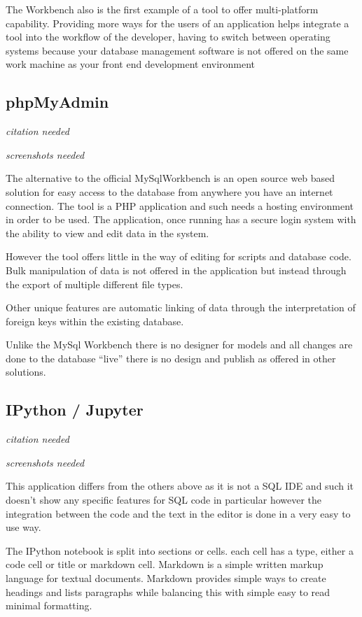 The Workbench also is the first example of a tool to offer
multi-platform capability. Providing more ways for the users of an
application helps integrate a tool into the workflow of the developer,
having to switch between operating systems because your database
management software is not offered on the same work machine as your
front end development environment

\subsection{phpMyAdmin}\label{phpmyadmin}

\emph{citation needed}

\emph{screenshots needed}

The alternative to the official MySqlWorkbench is an open source web
based solution for easy access to the database from anywhere you have an
internet connection. The tool is a PHP application and such needs a
hosting environment in order to be used. The application, once running
has a secure login system with the ability to view and edit data in the
system.

However the tool offers little in the way of editing for scripts and
database code. Bulk manipulation of data is not offered in the
application but instead through the export of multiple different file
types.

Other unique features are automatic linking of data through the
interpretation of foreign keys within the existing database.

Unlike the MySql Workbench there is no designer for models and all
changes are done to the database ``live'' there is no design and publish
as offered in other solutions.

\subsection{IPython / Jupyter}\label{ipython-jupyter}

\emph{citation needed}

\emph{screenshots needed}

This application differs from the others above as it is not a SQL IDE
and such it doesn't show any specific features for SQL code in
particular however the integration between the code and the text in the
editor is done in a very easy to use way.

The IPython notebook is split into sections or cells. each cell has a
type, either a code cell or title or markdown cell. Markdown is a simple
written markup language for textual documents. Markdown provides simple
ways to create headings and lists paragraphs while balancing this with
simple easy to read minimal formatting.

